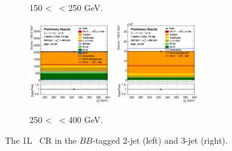 \begin{figure}[h!]
\begin{subfigure}[b]{\textwidth}
        \caption{150 < \ptv\ < 250 GeV.}
        \label{fig:plots_VHbb_1L_150_CRH}
    \end{subfigure}
    \begin{subfigure}[b]{\textwidth}
        \centering
        \includegraphics[width=0.40\textwidth]{Images/VH/Own_fit/postfit_VHbb/Region_distpTV_BMax400_BMin250_DCRHigh_J2_TTypebb_T2_L1_Y6051_GlobalFit_conditionnal_mu1.png}
        \includegraphics[width=0.40\textwidth]{Images/VH/Own_fit/postfit_VHbb/Region_distpTV_BMax400_BMin250_DCRHigh_J3_TTypebb_T2_L1_Y6051_GlobalFit_conditionnal_mu1.png}
        \caption{250 < \ptv\ < 400 GeV.}
        \label{fig:plots_VHbb_1L_250_CRH}
    \end{subfigure}
    \caption{The 1L \highdr\ CR in the $BB$-tagged 2-jet (left) and 3-jet (right).}
    \label{fig:plots_VHbb_1L_CRH}
\end{figure} 

\vspace*{\fill} \clearpage
\vspace*{\fill}


